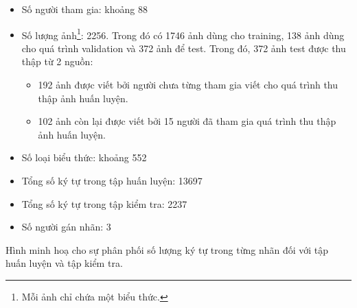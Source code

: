 \documentclass[a4paper,12pt]{article}
\begin{document}
	\begin{itemize}
		\item Số người tham gia: khoảng 88 
		\item Số lượng ảnh\footnote{Mỗi ảnh chỉ chứa một biểu thức.}:  2256. Trong đó có 1746 ảnh dùng cho training, 138 ảnh dùng cho quá trình validation và 372 ảnh để test.
		Trong đó, 372 ảnh test được thu thập từ 2 nguồn:
		\begin{itemize}
		 	\item 192 ảnh được viết bởi người chưa từng tham gia viết cho quá trình thu thập ảnh huấn luyện.
		 	\item 102 ảnh còn lại được viết bởi 15 người đã tham gia quá trình thu thập ảnh huấn luyện.
		\end{itemize}
		\item Số loại biểu thức: khoảng 552
		\item Tổng số ký tự trong tập huấn luyện: 13697
		\item Tổng số ký tự trong tập kiểm tra: 2237
		\item Số  người gán nhãn: 3
	\end{itemize}
	Hình minh hoạ cho sự phân phối số lượng ký tự trong từng nhãn đối với tập huấn luyện và tập kiểm tra.
\end{document}
